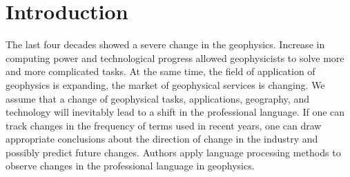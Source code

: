 \documentclass[geosciences,article,submit,moreauthors,pdftex]{Definitions/mdpi}
\begin{document}

\setcounter{section}{-1} %

\section{Introduction}
The last four decades showed a severe change in the geophysics. Increase in computing power and technological progress allowed geophysicists to solve more and more complicated tasks. At the same time, the field of application of geophysics is expanding, the market of geophysical services is changing. We assume that a change of geophysical tasks, applications, geography, and technology will inevitably lead to a shift in the professional language. If one can track changes in the frequency of terms used in recent years, one can draw appropriate conclusions about the direction of change in the industry and possibly predict future changes. Authors apply language processing methods to observe changes in the professional language in geophysics.
\end{document}
